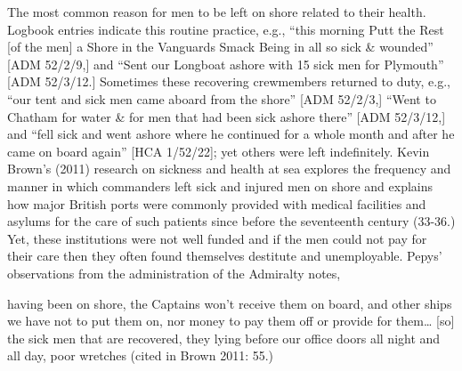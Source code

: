\begin{styleStandard}
The most common reason for men to be left on shore related to their health. Logbook entries indicate this routine practice, e.g., “this morning Putt the Rest [of the men] a Shore in the Vanguards Smack Being in all so sick \& wounded” [ADM 52/2/9,] and “Sent our Longboat ashore with 15 sick men for Plymouth” [ADM 52/3/12.] Sometimes these recovering crewmembers returned to duty, e.g., “our tent and sick men came aboard from the shore” [ADM 52/2/3,] “Went to Chatham for water \& for men that had been sick ashore there” [ADM 52/3/12,] and “fell sick and went ashore where he continued for a whole month and after he came on board again” [HCA 1/52/22]; yet others were left indefinitely. Kevin Brown’s (2011) research on sickness and health at sea explores the frequency and manner in which commanders left sick and injured men on shore and explains how major British ports were commonly provided with medical facilities and asylums for the care of such patients since before the seventeenth century (33-36.) Yet, these institutions were not well funded and if the men could not pay for their care then they often found themselves destitute and unemployable. Pepys’ observations from the administration of the Admiralty notes, 
\end{styleStandard}


\begin{styleStandard}
having been on shore, the Captains won’t receive them on board, and other ships we have not to put them on, nor money to pay them off or provide for them… [so] the sick men that are recovered, they lying before our office doors all night and all day, poor wretches (cited in Brown 2011: 55.) 
\end{styleStandard}


